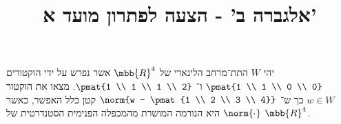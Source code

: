 \documentclass[a4paper,10pt,twoside,openany]{article}
\title{
אלגברה ב' - הצעה לפתרון מועד א'
}
\date{}
\begin{document}
\maketitle

\setcounter{exercise}{4}

\begin{exercise}
יהי
$W$
התת־מרחב הלינארי של
$\mbb{R}^4$
אשר נפרש על ידי הוקטורים
$\pmat{1 \\ 1 \\ 0 \\ 0}$
ו־%
$\pmat{1 \\ 1 \\ 1 \\ 2}$.
מצאו את הוקטור
$w \in W$
כך ש־%
$\norm{w - \pmat{1 \\ 2 \\ 3 \\ 4}}$
קטן כלל האפשר, כאשר
$\norm{\cdot}$
היא הנורמה המושרת מהמכפלה הפנימית הסטנדרטית של
$\mbb{R}^4$.
\end{exercise}
\end{document}
